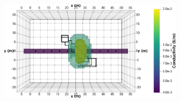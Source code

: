 \documentclass[preprint,authoryear,12pt]{elsarticle}
\begin{document}
\begin{figure}[htp]{}
\begin{center}
\begin{subfigure}{0.53\linewidth}
      \end{subfigure}
      \hspace{-4.0cm}
      \qquad
      \begin{subfigure}{0.53\linewidth}
         \label{fig:SynthMosaic_StraightTunnel_SingleLinear_Top}
         \includegraphics[trim=0cm 0cm 0cm 0cm, clip=true,width=\linewidth]{./figures/Fig13b.png}
      \end{subfigure}
      \vspace{0.15cm}


\end{center}
\end{figure}
\end{document}
